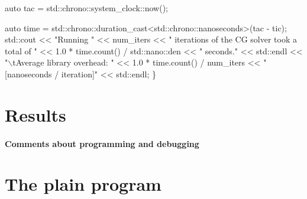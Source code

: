 \begin{DoxyCode}
    \textcolor{keyword}{auto} tac = std::chrono::system\_clock::now();

    \textcolor{keyword}{auto} time = std::chrono::duration\_cast<std::chrono::nanoseconds>(tac - tic);
    std::cout << \textcolor{stringliteral}{"Running "} << num\_iters
              << \textcolor{stringliteral}{" iterations of the CG solver took a total of "}
              << 1.0 * time.count() / std::nano::den << \textcolor{stringliteral}{" seconds."} << std::endl
              << \textcolor{stringliteral}{"\(\backslash\)tAverage library overhead:     "}
              << 1.0 * time.count() / num\_iters << \textcolor{stringliteral}{" [nanoseconds / iteration]"}
              << std::endl;
\}
\end{DoxyCode}
 \label{_Results}%
\section*{Results}

\label{_Commentsaboutprogramminganddebugging}%
\paragraph*{Comments about programming and debugging }

\label{_PlainProg}%
 \section*{The plain program}


\begin{DoxyCodeInclude}
\end{DoxyCodeInclude}
 